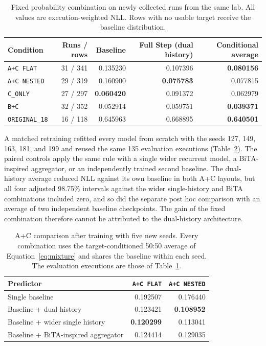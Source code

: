 \begin{table}[htbp]
\centering
\caption[Fixed probability combination on newly collected runs]{Fixed probability combination on newly collected runs from the
same lab. All values are execution-weighted NLL. Rows with no usable
target receive the baseline distribution.}
\label{tab:mix}
\begin{tabularx}{\textwidth}{@{}Xrrrr@{}}
\toprule
Condition & Runs / rows & Baseline & Full Step (dual history) & Conditional average \\
\midrule
\texttt{A+C FLAT} & 31 / 341 & 0.135230 & 0.107396 & \textbf{0.080156} \\
\texttt{A+C NESTED} & 29 / 319 & 0.160900 & \textbf{0.075783} & 0.077815 \\
\texttt{C\_ONLY} & 27 / 297 & \textbf{0.060420} & 0.091372 & 0.062979 \\
\texttt{B+C} & 32 / 352 & 0.052914 & 0.059751 & \textbf{0.039371} \\
\texttt{ORIGINAL\_18} & 16 / 118 & 0.645963 & 0.668895 & \textbf{0.640501} \\
\bottomrule
\end{tabularx}
\end{table}

A matched retraining refitted every model from scratch with the seeds
127, 149, 163, 181, and 199 and reused the same 135 evaluation
executions (Table~\ref{tab:matched}). The paired controls apply the same
rule with a single wider recurrent model, a BiTA-inspired aggregator,
or an independently trained second baseline. The dual-history average
reduced NLL against its own baseline in both A+C layouts, but all four
adjusted 98.75\% intervals against the wider single-history and BiTA
combinations included zero, and so did the separate post hoc comparison
with an average of two independent baseline checkpoints. The gain of
the fixed combination therefore cannot be attributed to the dual-history
architecture.

\begin{table}[htbp]
\centering
\caption[A+C comparison after training with five new seeds]{A+C comparison after training with five new seeds. Every
combination uses the target-conditioned 50:50 average of
Equation~\ref{eq:mixture} and shares the baseline within each seed. The
evaluation executions are those of Table~\ref{tab:mix}.}
\label{tab:matched}
\begin{tabularx}{\textwidth}{@{}Xrr@{}}
\toprule
Predictor & \texttt{A+C FLAT} & \texttt{A+C NESTED} \\
\midrule
Single baseline & 0.192507 & 0.176440 \\
Baseline + dual history & 0.123421 & \textbf{0.108952} \\
Baseline + wider single history & \textbf{0.120299} & 0.113041 \\
Baseline + BiTA-inspired aggregator & 0.124414 & 0.129035 \\
\bottomrule
\end{tabularx}
\end{table}

